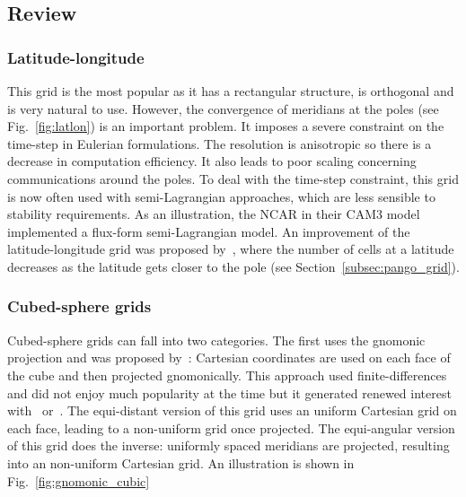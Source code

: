 \subsection{Review}
\label{subsec:grids}
\subsubsection{Latitude-longitude}
This grid is the most popular as it has a rectangular structure, is orthogonal
and is very natural to use. However, the convergence of meridians at the poles
(see Fig.~\ref{fig:latlon}) is an important problem. It imposes a severe
constraint on the time-step in Eulerian formulations. The resolution
is anisotropic so there is a decrease in computation efficiency. It also leads
to poor scaling concerning communications around the poles. To deal with the
time-step constraint, this grid is now often used with semi-Lagrangian
approaches, which are less sensible to stability requirements. As an
illustration, the \gls{NCAR} in their CAM3 model implemented a flux-form
semi-Lagrangian model. An improvement of the latitude-longitude grid was
proposed by~\cite{Kurihara1965}, where the number of cells at a latitude
decreases as the latitude gets closer to the pole (see
Section~\ref{subsec:pango_grid}).

\subsubsection{Cubed-sphere grids}
Cubed-sphere grids can fall into two categories. The first uses the
\gls{gnomonic} projection and was proposed by~\cite{Sadourny1972}: Cartesian
coordinates are used on each face of the cube and then projected gnomonically.
This approach used finite-differences and did not enjoy much popularity at the
time but it generated renewed interest with~\cite{Rancic1996}
or~\cite{Harris2011}.
The equi-distant version of this grid uses an uniform Cartesian grid on each
face, leading to a non-uniform grid once projected. The equi-angular version of
this grid does the inverse: uniformly spaced meridians are projected, resulting
into an non-uniform Cartesian grid. An illustration is shown in
Fig.~\ref{fig:gnomonic_cubic}

